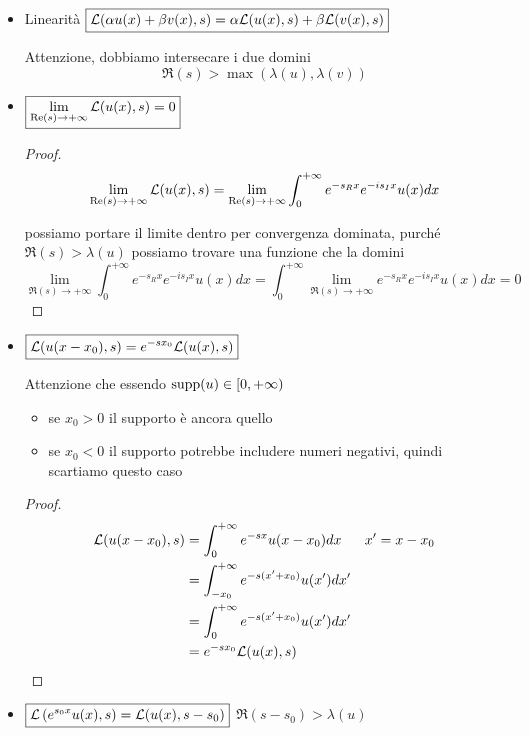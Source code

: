 \begin{itemize}
\item Linearità $\boxed{\mathcal{L}(\alpha u(x) + \beta v(x), s) = \alpha \mathcal{L}(u(x), s) + \beta \mathcal{L}(v(x), s)}$

Attenzione, dobbiamo intersecare i due domini
\begin{equation*}
\boxed{\Re (s) > \max(\lambda (u), \lambda (v))}
\end{equation*}
\item $\boxed{\lim\limits_{\operatorname{Re} (s)\rightarrow + \infty}\mathcal{L}(u(x), s) = 0}$

\begin{proof}
\begin{equation*}
\lim\limits_{\operatorname{Re} (s)\rightarrow + \infty}\mathcal{L}(u(x), s) = \lim\limits_{\operatorname{Re} (s)\rightarrow + \infty}\int^{+ \infty}_{0} e^{- s_{R} x} e^{- is_{I} x} u(x) dx
\end{equation*}

possiamo portare il limite dentro per convergenza dominata, purché $\Re (s) > \lambda (u)$ possiamo trovare una funzione che la domini
\begin{equation*}
\lim\limits_{\Re (s)\rightarrow + \infty}\int^{+ \infty}_{0} e^{- s_{R} x} e^{- is_{I} x} u(x) dx = \int^{+ \infty}_{0}\lim\limits_{\Re (s)\rightarrow + \infty} e^{- s_{R} x} e^{- is_{I} x} u(x) dx = 0
\end{equation*}
\end{proof}
\item $\boxed{\mathcal{L}(u(x - x_{0}), s) = e^{- sx_{0}}\mathcal{L}(u(x), s)}$

Attenzione che essendo $\operatorname*{supp}(u) \in [0, + \infty)$
\begin{itemize}
\item se $\boxed{x_{0} > 0}$ il supporto è ancora quello
\item se $x_{0} < 0$ il supporto potrebbe includere numeri negativi, quindi scartiamo questo caso
\end{itemize}

\begin{proof}
\begin{equation*}
\begin{aligned}
\mathcal{L}(u(x - x_{0}), s) & = \int^{+ \infty}_{0} e^{- sx} u(x - x_{0}) dx & x' = x - x_{0}\\
 & = \int^{+ \infty}_{- x_{0}} e^{- s(x' + x_{0})} u(x') dx' & \\
 & = \int^{+ \infty}_{0} e^{- s(x' + x_{0})} u(x') dx' & \\
 & = e^{- sx_{0}}\mathcal{L}(u(x), s) &
\end{aligned}
\end{equation*}
\end{proof}
\item $\boxed{\mathcal{L}\left(e^{s_{0} x} u(x), s\right) = \mathcal{L}(u(x), s - s_{0})}$ $\boxed{\Re (s - s_{0}) > \lambda (u)}$


\end{itemize}
